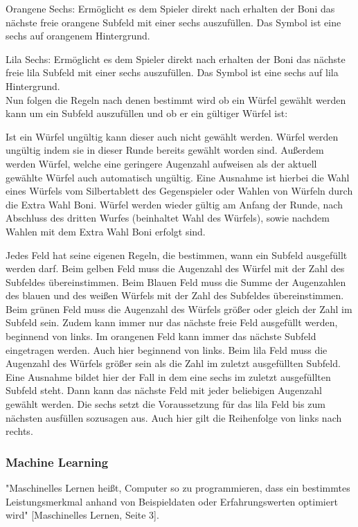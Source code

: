Orangene Sechs: Ermöglicht es dem Spieler direkt nach erhalten der Boni das nächste freie orangene Subfeld mit einer sechs auszufüllen. Das Symbol ist eine sechs auf orangenem Hintergrund.

Lila Sechs: Ermöglicht es dem Spieler direkt nach erhalten der Boni das nächste freie lila Subfeld mit einer sechs auszufüllen. Das Symbol ist eine sechs auf lila Hintergrund. \\

Nun folgen die Regeln nach denen bestimmt wird ob ein Würfel gewählt werden kann um ein Subfeld auszufüllen und ob er ein gültiger Würfel ist:

Ist ein Würfel ungültig kann dieser auch nicht gewählt werden. Würfel werden ungültig indem sie in dieser Runde bereits gewählt worden sind. Außerdem werden Würfel, welche eine geringere Augenzahl aufweisen als der aktuell gewählte Würfel auch automatisch ungültig. Eine Ausnahme ist hierbei die Wahl eines Würfels vom Silbertablett des Gegenspieler oder Wahlen von Würfeln durch die Extra Wahl Boni. Würfel werden wieder gültig am Anfang der Runde, nach Abschluss des dritten Wurfes (beinhaltet Wahl des Würfels), sowie nachdem Wahlen mit dem Extra Wahl Boni erfolgt sind.

Jedes Feld hat seine eigenen Regeln, die bestimmen, wann ein Subfeld ausgefüllt werden darf. Beim gelben Feld muss die Augenzahl des Würfel mit der Zahl des Subfeldes übereinstimmen. Beim Blauen Feld muss die Summe der Augenzahlen des blauen und des weißen Würfels mit der Zahl des Subfeldes übereinstimmen. Beim grünen Feld muss die Augenzahl des Würfels größer oder gleich der Zahl im Subfeld sein. Zudem kann immer nur das nächste freie Feld ausgefüllt werden, beginnend von links. Im orangenen Feld kann immer das nächste Subfeld eingetragen werden. Auch hier beginnend von links. Beim lila Feld muss die Augenzahl des Würfels größer sein als die Zahl im zuletzt ausgefüllten Subfeld. Eine Ausnahme bildet hier der Fall in dem eine sechs im zuletzt ausgefüllten Subfeld steht. Dann kann das nächste Feld mit jeder beliebigen Augenzahl gewählt werden. Die sechs setzt die Voraussetzung für das lila Feld bis zum nächsten ausfüllen sozusagen aus. Auch hier gilt die Reihenfolge von links nach rechts.
\subsubsection{Machine Learning}
"Maschinelles Lernen heißt, Computer so zu programmieren, dass ein bestimmtes Leistungsmerkmal anhand von Beispieldaten oder Erfahrungswerten optimiert wird" [Maschinelles Lernen, Seite 3].


